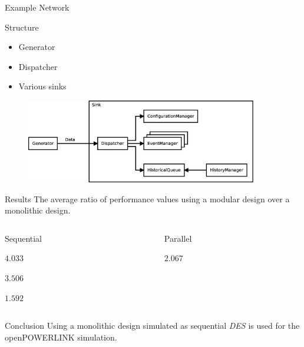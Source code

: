 \begin{frame}{Example Network}
    \begin{block}{Structure}
        \begin{multicols}{3}
            \begin{itemize}
                \item Generator
                \item Dispatcher
                \item Various sinks
            \end{itemize}
        \end{multicols}
    \end{block}
    
    \begin{figure}
        \includegraphics[width=0.9\textwidth]{../../thesis/images/design_test_network.eps}
    \end{figure}
\end{frame}

\begin{frame}{Results}
    The average ratio of performance values using a modular design over a monolithic design.
    \begin{columns}
        \begin{column}{0.48\textwidth}
            \begin{block}{Sequential\strut}
        \begin{description}
            \item[runtime] $4.033$
            \item[created events] $3.506$
            \item[real-time] $1.592$
        \end{description}
            \end{block}
        \end{column}
        \begin{column}{0.48\textwidth}
            \begin{block}{Parallel\strut}
                \begin{description}
                    \item[runtime] $2.067$
                \end{description}
            \end{block}
        \end{column}
    \end{columns}
    
    \begin{block}{Conclusion}
        Using a monolithic design simulated as sequential \emph{DES} is used for the openPOWERLINK simulation.
    \end{block}
    
\end{frame}